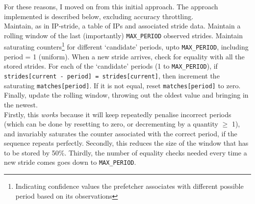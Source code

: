 \documentclass[11pt]{article}
\begin{document}
For these reasons, I moved on from this initial approach. The approach implemented is described below, excluding accuracy throttling.
\\
Maintain, as in IP-stride, a table of IPs and associated stride data. Maintain a rolling window of the last (importantly) \verb|MAX_PERIOD| observed strides. Maintain saturating counters\footnote{Indicating confidence values the prefetcher associates with different possible period based on its observations} for different `candidate' periods, upto \verb|MAX_PERIOD|, including period = 1 (uniform). When a new stride arrives, check for equality with all the stored strides. For each of the `candidate' periods (1 to \verb|MAX_PERIOD|), if \verb|strides[current - period] = strides[current]|, then increment the saturating \verb|matches[period]|. If it is not equal, reset \verb|matches[period]| to zero. Finally, update the rolling window, throwing out the oldest value and bringing in the newest.
\\
Firstly, this \textit{works} because it will keep repeatedly penalise incorrect periods (which can be done by resetting to zero, or decrementing by a quantity $\ge$ 1), and invariably saturates the counter associated with the correct period, if the sequence repeats perfectly. Secondly, this reduces the size of the window that has to be stored by 50\%. Thirdly, the number of equality checks needed every time a new stride comes goes down to \verb|MAX_PERIOD|.
\end{document}
